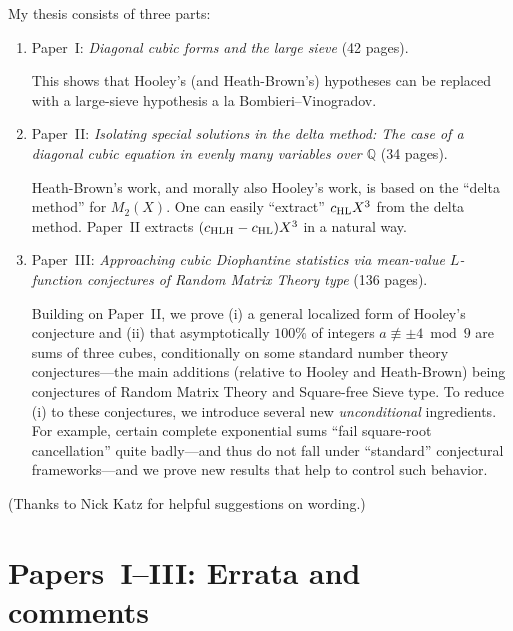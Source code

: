 \documentclass[12pt]{article}
\begin{document}
My thesis consists of three parts:
\begin{enumerate}
    \item Paper~I:
    \emph{Diagonal cubic forms and the large sieve}
    (42 pages).
    
    This shows that Hooley's (and Heath-Brown's) hypotheses can be replaced with
    a large-sieve hypothesis a la Bombieri--Vinogradov.
    
    \item Paper~II:
    \emph{Isolating special solutions in the delta method:
    The case of a diagonal cubic equation in evenly many variables over $\mathbb{Q}$}
    (34 pages).
    
    Heath-Brown's work, and morally also Hooley's work, is based on the ``delta method'' for $M_2(X)$.
    One can easily ``extract'' $c_{\textnormal{HL}}X^3$ from the delta method.
    Paper~II extracts $(c_{\textnormal{HLH}}-c_{\textnormal{HL}})X^3$ in a natural way.
    
    \item Paper~III:
    \emph{Approaching cubic Diophantine statistics via mean-value $L$-function conjectures of Random Matrix Theory type}
    (136 pages).
    
    Building on Paper~II,
    we prove (i) a general localized form of Hooley's conjecture
    and (ii) that asymptotically $100\%$ of integers $a\not\equiv \pm4\bmod{9}$ are sums of three cubes,
    conditionally on some standard number theory conjectures---the main additions (relative to Hooley and Heath-Brown) being conjectures of Random Matrix Theory and Square-free Sieve type.
    To reduce (i) to these conjectures,
    we introduce several new \emph{unconditional} ingredients.
    For example, certain complete exponential sums ``fail square-root cancellation'' quite badly---and thus do not fall under ``standard'' conjectural frameworks---and we prove new results that help to control such behavior.
\end{enumerate}

(Thanks to Nick Katz for helpful suggestions on wording.)

\section{Papers~I--III: Errata and comments}
\end{document}
